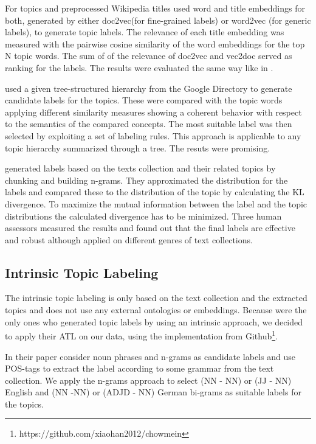For topics and preprocessed Wikipedia titles \textit{\cite{Bhatia2016}} used word and title embeddings for both, generated by either doc2vec(for fine-grained labels) or word2vec (for generic labels), to generate topic labels. The relevance of each title embedding was measured with the pairwise cosine similarity of the word embeddings for the top N topic words. The sum of of the relevance of doc2vec and vec2doc served as ranking for the labels. The results were evaluated the same way like in \cite{Lau2011}.

\textit{\cite{Magatti2009}} used a given tree-structured hierarchy from the Google Directory to generate candidate labels for the topics. These were compared with the topic words applying different similarity measures showing a coherent behavior with respect to the semantics of the compared concepts. The most suitable label was then selected by exploiting a set of labeling
rules. This approach is applicable to any topic hierarchy summarized through a tree. The resuts were promising.

\textit{\cite{Mei2007}} generated labels based on the texts collection and their related topics by chunking and building n-grams. They approximated the distribution for the labels and compared these to the distribution of the topic by calculating the \ac{KL} divergence. To maximize the mutual information between the label and the topic distributions the calculated divergence has to be minimized. Three human assessors measured the results and found out that the final labels are effective and robust although applied on different genres of text collections. 


\subsection{Intrinsic Topic Labeling}
\label{sec:intrinsic}
The intrinsic topic labeling is only based on the text collection and the extracted topics and does not use any external ontologies or embeddings. Because \textit{\cite{Mei2007}} were the only ones who generated topic labels by using an intrinsic approach, we decided to apply their \ac{ATL} on our data, using the implementation from Github\footnote{https://github.com/xiaohan2012/chowmein}. 

In their paper \textit{\cite{Mei2007}} consider noun phrases and n-grams as candidate labels and use \ac{POS}-tags to extract the label according to some grammar from the text collection. We apply the n-grams approach to select (NN - NN) or (JJ - NN) English and (NN -NN) or (ADJD - NN) German bi-grams as suitable labels for the topics.


